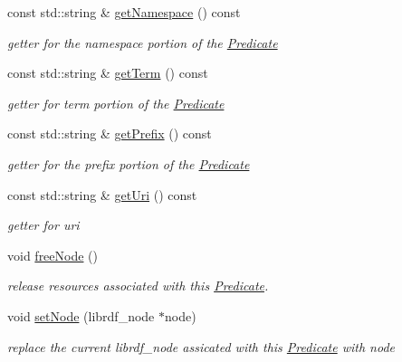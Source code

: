 \begin{DoxyCompactItemize}
const std\+::string \& \hyperlink{classomexmeta_1_1Predicate_add4ab1cd86f83de3512279bbfdad947c}{get\+Namespace} () const
\begin{DoxyCompactList}\small\item\em getter for the namespace portion of the \hyperlink{classomexmeta_1_1Predicate}{Predicate} \end{DoxyCompactList}\item 
const std\+::string \& \hyperlink{classomexmeta_1_1Predicate_a54a15176bd697d37d00573bf86954630}{get\+Term} () const
\begin{DoxyCompactList}\small\item\em getter for term portion of the \hyperlink{classomexmeta_1_1Predicate}{Predicate} \end{DoxyCompactList}\item 
const std\+::string \& \hyperlink{classomexmeta_1_1Predicate_a0147e977f71604db05763815ae6b553f}{get\+Prefix} () const
\begin{DoxyCompactList}\small\item\em getter for the prefix portion of the \hyperlink{classomexmeta_1_1Predicate}{Predicate} \end{DoxyCompactList}\item 
const std\+::string \& \hyperlink{classomexmeta_1_1Predicate_a27fa7d62ad9a5182f3dd642bc61c8d9f}{get\+Uri} () const
\begin{DoxyCompactList}\small\item\em getter for uri \end{DoxyCompactList}\item 
void \hyperlink{classomexmeta_1_1Predicate_a718a37ff90ac0f2d7cc129e8351a2c7b}{free\+Node} ()
\begin{DoxyCompactList}\small\item\em release resources associated with this \hyperlink{classomexmeta_1_1Predicate}{Predicate}. \end{DoxyCompactList}\item 
void \hyperlink{classomexmeta_1_1Predicate_a0bf6030510247a6999d81cada92c1e51}{set\+Node} (librdf\+\_\+node $\ast$node)
\begin{DoxyCompactList}\small\item\em replace the current librdf\+\_\+node assicated with this \hyperlink{classomexmeta_1_1Predicate}{Predicate} with node \end{DoxyCompactList}\end{DoxyCompactItemize}
